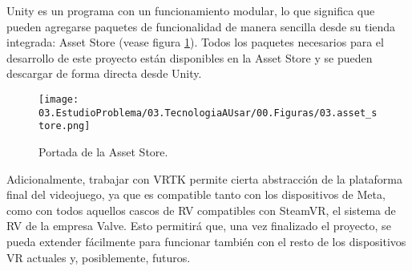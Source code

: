 Unity es un programa con un funcionamiento modular, lo que significa que pueden agregarse paquetes de funcionalidad de manera sencilla desde su tienda integrada: Asset Store (vease figura \ref{fig:TU_assetStore}). Todos los paquetes necesarios para el desarrollo de este proyecto están disponibles en la Asset Store y se pueden descargar de forma directa desde Unity.

\begin{figure}[H]
  \centering
\texttt{[image: 03.EstudioProblema/03.TecnologiaAUsar/00.Figuras/03.asset\_store.png]}
    \caption{Portada de la Asset Store.}
    \label{fig:TU_assetStore}
\end{figure}



Adicionalmente, trabajar con VRTK permite cierta abstracción de la plataforma final del videojuego, ya que es compatible tanto con los dispositivos de Meta, como con todos aquellos cascos de RV compatibles con SteamVR, el sistema de RV de la empresa Valve. Esto permitirá que, una vez finalizado el proyecto, se pueda extender fácilmente para funcionar también con el resto de los dispositivos VR actuales y, posiblemente, futuros.


\chapterend
